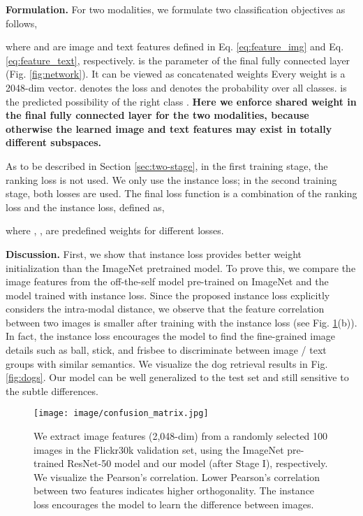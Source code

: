 \documentclass[10pt,final,journal]{IEEEtran}
\begin{document}
\textbf{Formulation.}
For two modalities, we formulate two classification objectives as follows,

where  and  are image and text features defined in Eq. \ref{eq:feature_img} and Eq. \ref{eq:feature_text}, respectively.  is the parameter of the final fully connected layer (Fig. \ref{fig:network}). It can be viewed as concatenated weights  Every weight  is a 2048-dim vector.  denotes the loss and  denotes the probability over all classes.  is the predicted possibility of the right class . \textbf{Here we enforce shared weight  in the final fully connected layer for the two modalities, because otherwise the learned image and text features may exist in totally different subspaces.}

As to be described in Section \ref{sec:two-stage}, in the first training stage, the ranking loss is not used. We only use the instance loss; in the second training stage, both losses are used.
The final loss function is a combination of the ranking loss and the instance loss, defined as,

where , ,  are predefined weights for different losses.

\label{discussion}
\textbf{Discussion.} First, we show that instance loss provides better weight initialization than the ImageNet pretrained model. To prove this, we compare the image features from the off-the-self model pre-trained on ImageNet and the model trained with instance loss. Since the proposed instance loss explicitly considers the intra-modal distance, we observe that the feature correlation between two images is smaller after training with the instance loss (see Fig. \ref{fig:imagenet}(b)). 
In fact, the instance loss encourages the model to find the fine-grained image details such as ball, stick, and frisbee to discriminate between image / text groups with similar semantics. We visualize the dog retrieval results in Fig. \ref{fig:dogs}. Our model can be well generalized to the test set and still sensitive to the subtle differences.

\begin{figure}[t]
 \begin{center}
\texttt{[image: image/confusion\_matrix.jpg]}
 \end{center}
    \caption{We extract image features (2,048-dim) from a randomly selected 100 images in the Flickr30k validation set, using the ImageNet pre-trained ResNet-50 model and our model (after Stage I), respectively. We visualize the  Pearson's correlation. Lower Pearson's correlation between two features indicates higher orthogonality. The instance loss encourages the model to learn the difference between images.}
 \label{fig:imagenet}
\end{figure}
\end{document}

